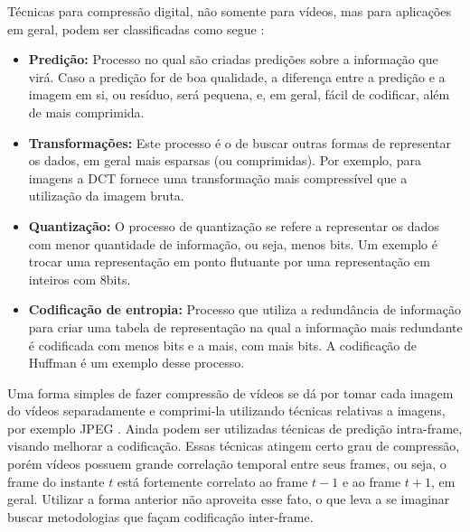 \documentclass[cic,tc]{iiufrgs}
\begin{document}
Técnicas para compressão digital, não somente para vídeos, mas para aplicações em geral,
podem ser classificadas como segue \cite{SullivanH264}:
\begin{itemize}
    \item \textbf{Predição:} Processo no qual são criadas predições sobre a informação 
    que virá. Caso a predição for de boa qualidade, a diferença entre a predição e a 
    imagem em si, ou resíduo, será pequena, e, em geral, fácil de codificar, além de mais
    comprimida.
    \item \textbf{Transformações:} Este processo é o de buscar outras formas de representar
    os dados, em geral mais esparsas (ou comprimidas). Por exemplo, para imagens a DCT 
    fornece uma transformação mais compressível que a utilização da imagem bruta.
    \item \textbf{Quantização:} O processo de quantização se refere a representar os dados
    com menor quantidade de informação, ou seja, menos bits. Um exemplo é trocar uma representação 
    em ponto flutuante por uma representação em inteiros com 8bits.
    \item \textbf{Codificação de entropia:} Processo que utiliza a redundância de informação para 
    criar uma tabela de representação na qual a informação mais redundante é codificada
    com menos bits e a mais, com mais bits. A codificação de Huffman é um exemplo desse processo.
\end{itemize}

Uma forma simples de fazer compressão de vídeos se dá por tomar cada imagem do vídeos
separadamente e comprimi-la utilizando técnicas relativas a imagens, por exemplo JPEG \cite{SullivanH264}.
Ainda podem ser utilizadas técnicas de predição intra-frame, visando melhorar a codificação.
Essas técnicas atingem certo grau de compressão, porém vídeos possuem grande correlação temporal
entre seus frames, ou seja, o frame do instante $t$ está fortemente correlato ao frame $t-1$ e
ao frame $t+1$, em geral.
Utilizar a forma anterior não aproveita esse fato, o que leva a se imaginar buscar metodologias
que façam codificação inter-frame.
\end{document}
